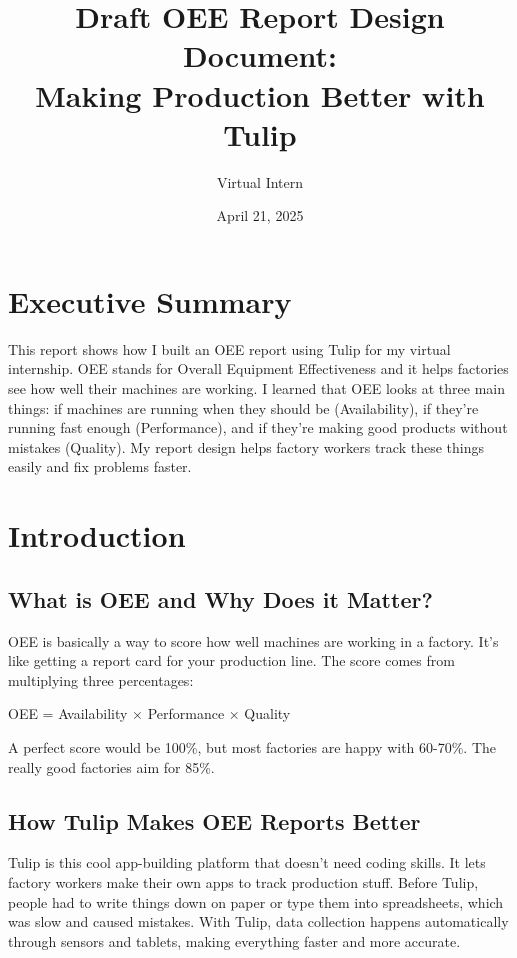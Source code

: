 \documentclass{article}
\title{Draft OEE Report Design Document: \\
Making Production Better with Tulip}
\author{Virtual Intern}
\date{April 21, 2025}
\begin{document}
\maketitle

\section*{Executive Summary}
This report shows how I built an OEE report using Tulip for my virtual internship. OEE stands for Overall Equipment Effectiveness and it helps factories see how well their machines are working. I learned that OEE looks at three main things: if machines are running when they should be (Availability), if they're running fast enough (Performance), and if they're making good products without mistakes (Quality). My report design helps factory workers track these things easily and fix problems faster.

\section{Introduction}

\subsection{What is OEE and Why Does it Matter?}
OEE is basically a way to score how well machines are working in a factory. It's like getting a report card for your production line. The score comes from multiplying three percentages:

\begin{center}
OEE = Availability × Performance × Quality
\end{center}

A perfect score would be 100\%, but most factories are happy with 60-70\%. The really good factories aim for 85\%.

\subsection{How Tulip Makes OEE Reports Better}
Tulip is this cool app-building platform that doesn't need coding skills. It lets factory workers make their own apps to track production stuff. Before Tulip, people had to write things down on paper or type them into spreadsheets, which was slow and caused mistakes. With Tulip, data collection happens automatically through sensors and tablets, making everything faster and more accurate.
\end{document}
